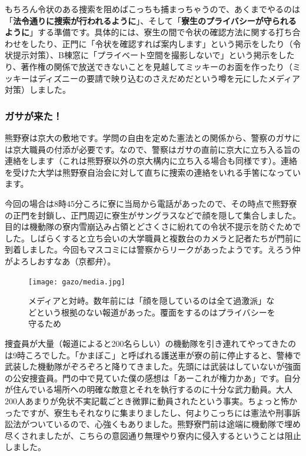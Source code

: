 もちろん令状のある捜索を阻めばこっちも捕まっちゃうので、あくまでやるのは「\textbf{法令通りに捜索が行われるように}」、そして「\textbf{寮生のプライバシーが守られるように}」する準備です。具体的には、寮生の間で令状の確認方法に関する打ち合わせをしたり、正門に「令状を確認すれば案内します」という掲示をしたり（令状提示対策）、B棟窓に「プライベート空間を撮影しないで」という掲示をしたり、著作権の関係で放送できないことを見越してミッキーのお面を作ったり（ミッキーはディズニーの要請で映り込むのさえだめだという噂を元にしたメディア対策）しました。


\subsubsection{ガサが来た！}


熊野寮は京大の敷地です。学問の自由を定めた憲法との関係から、警察のガサには京大職員の付添が必要です。なので、警察はガサの直前に京大に立ち入る旨の連絡をします（これは熊野寮以外の京大構内に立ち入る場合も同様です）。連絡を受けた大学は熊野寮自治会に対して直ちに捜索の連絡をいれる手筈になっています。

今回の場合は8時45分ころに寮に当局から電話があったので、その時点で熊野寮の正門を封鎖し、正門周辺に寮生がサングラスなどで顔を隠して集合しました。目的は機動隊の寮内雪崩込み占領とどさくさに紛れての令状不提示を防ぐためでした。しばらくすると立ち会いの大学職員と複数台のカメラと記者たちが門前に到着しました。今回もマスコミには警察からリークがあったようです。えろう仲がよろしおすなあ（京都弁）。

\begin{figure}
  \centering
  \texttt{[image: gazo/media.jpg]}
  \caption*{{\small メディアと対峙。数年前には「顔を隠しているのは全て過激派」などという根拠のない報道があった。覆面をするのはプライバシーを守るため}}
\end{figure}

捜査員が大量（報道によると200名らしい）の機動隊を引き連れてやってきたのは9時ころでした。「かまぼこ」と呼ばれる護送車が寮の前に停止すると、警棒で武装した機動隊がぞろぞろと降りてきました。先頭には武装はしていないが強面の公安捜査員。門の中で見ていた僕の感想は「あーこれが権力かあ」です。自分が住んでいる場所への明確な敵意とそれを執行するのに十分な武力動員。大人200人あまりが免状不実記載ごとき微罪に動員されたという事実。ちょっと怖かったですが、寮生もそれなりに集まりましたし、何よりこっちには憲法や刑事訴訟法がついているので、心強くもありました。熊野寮門前は途端に機動隊で埋め尽くされましたが、こちらの意図通り無理やり寮内に侵入するということは阻止しました。


